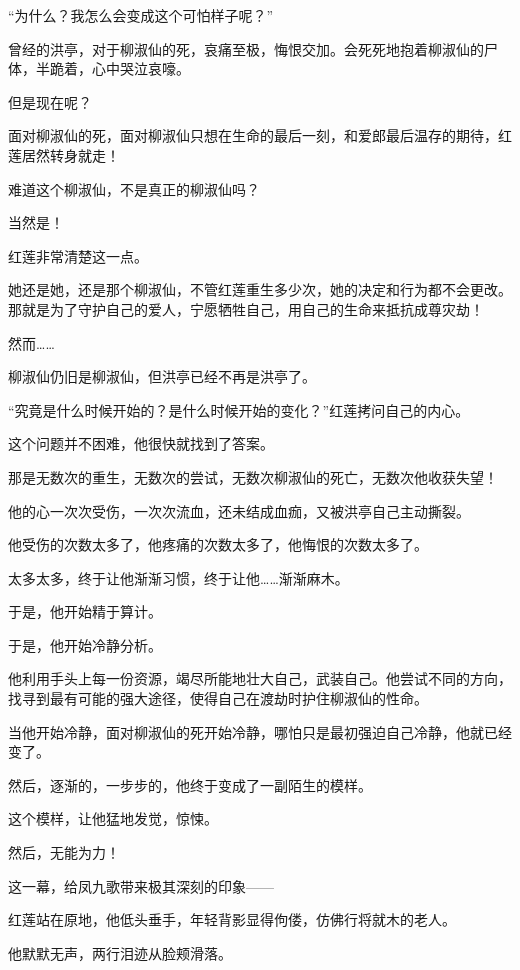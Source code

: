 
\begin{this_body}

“为什么？我怎么会变成这个可怕样子呢？”

曾经的洪亭，对于柳淑仙的死，哀痛至极，悔恨交加。会死死地抱着柳淑仙的尸体，半跪着，心中哭泣哀嚎。

但是现在呢？

面对柳淑仙的死，面对柳淑仙只想在生命的最后一刻，和爱郎最后温存的期待，红莲居然转身就走！

难道这个柳淑仙，不是真正的柳淑仙吗？

当然是！

红莲非常清楚这一点。

她还是她，还是那个柳淑仙，不管红莲重生多少次，她的决定和行为都不会更改。那就是为了守护自己的爱人，宁愿牺牲自己，用自己的生命来抵抗成尊灾劫！

然而……

柳淑仙仍旧是柳淑仙，但洪亭已经不再是洪亭了。

“究竟是什么时候开始的？是什么时候开始的变化？”红莲拷问自己的内心。

这个问题并不困难，他很快就找到了答案。

那是无数次的重生，无数次的尝试，无数次柳淑仙的死亡，无数次他收获失望！

他的心一次次受伤，一次次流血，还未结成血痂，又被洪亭自己主动撕裂。

他受伤的次数太多了，他疼痛的次数太多了，他悔恨的次数太多了。

太多太多，终于让他渐渐习惯，终于让他……渐渐麻木。

于是，他开始精于算计。

于是，他开始冷静分析。

他利用手头上每一份资源，竭尽所能地壮大自己，武装自己。他尝试不同的方向，找寻到最有可能的强大途径，使得自己在渡劫时护住柳淑仙的性命。

当他开始冷静，面对柳淑仙的死开始冷静，哪怕只是最初强迫自己冷静，他就已经变了。

然后，逐渐的，一步步的，他终于变成了一副陌生的模样。

这个模样，让他猛地发觉，惊悚。

然后，无能为力！

这一幕，给凤九歌带来极其深刻的印象——

红莲站在原地，他低头垂手，年轻背影显得佝偻，仿佛行将就木的老人。

他默默无声，两行泪迹从脸颊滑落。


\end{this_body}
